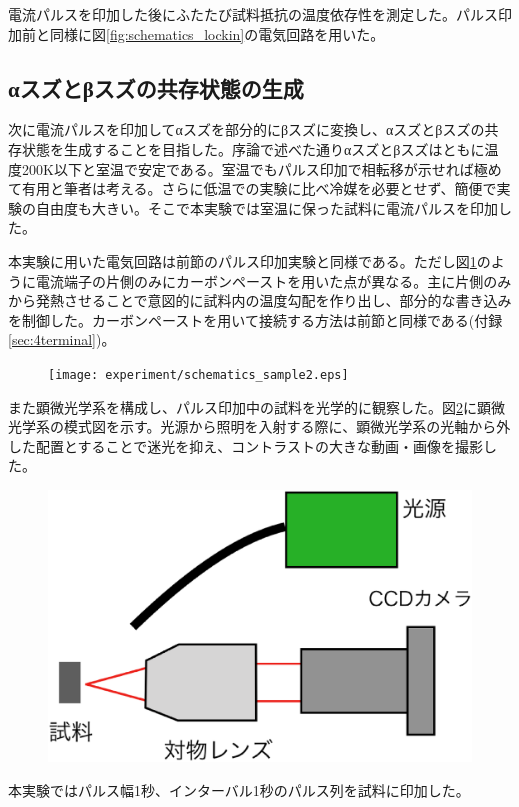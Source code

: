 電流パルスを印加した後にふたたび試料抵抗の温度依存性を測定した。パルス印加前と同様に図\ref{fig:schematics_lockin}の電気回路を用いた。

\subsection{αスズとβスズの共存状態の生成}
次に電流パルスを印加してαスズを部分的にβスズに変換し、αスズとβスズの共存状態を生成することを目指した。序論で述べた通りαスズとβスズはともに温度200K以下と室温で安定である。室温でもパルス印加で相転移が示せれば極めて有用と筆者は考える。さらに低温での実験に比べ冷媒を必要とせず、簡便で実験の自由度も大きい。そこで本実験では室温に保った試料に電流パルスを印加した。

本実験に用いた電気回路は前節のパルス印加実験と同様である。ただし図\ref{fig:schematics_sample2}のように電流端子の片側のみにカーボンペーストを用いた点が異なる。主に片側のみから発熱させることで意図的に試料内の温度勾配を作り出し、部分的な書き込みを制御した。カーボンペーストを用いて接続する方法は前節と同様である(付録\ref{sec:4terminal})。
\begin{figure}[!h]
    \begin{center}
   \texttt{[image: experiment/schematics\_sample2.eps]}
  \end{center}
  \caption{}
  \label{fig:schematics_sample2}
\end{figure}

また顕微光学系を構成し、パルス印加中の試料を光学的に観察した。図\ref{fig:microscope}に顕微光学系の模式図を示す。光源から照明を入射する際に、顕微光学系の光軸から外した配置とすることで迷光を抑え、コントラストの大きな動画・画像を撮影した。
\begin{figure}[!h]
    \begin{center}
   \includegraphics[width=0.35\hsize]{experiment/microscope.eps}
  \end{center}
  \caption{}
  \label{fig:microscope}
\end{figure}

本実験ではパルス幅1秒、インターバル1秒のパルス列を試料に印加した。


\clearpage

